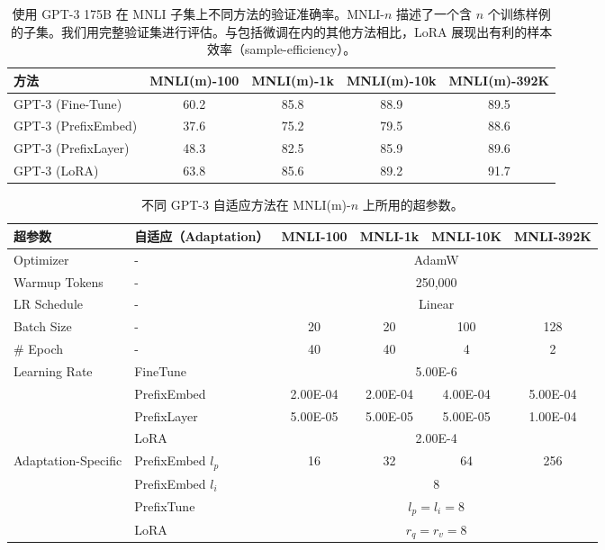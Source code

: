 \documentclass[11pt,UTF8,fontset=fandol]{ctexart}
\begin{document}
\begin{table}[H]\centering
\caption{使用 GPT-3 175B 在 MNLI 子集上不同方法的验证准确率。MNLI-$n$ 描述了一个含 $n$ 个训练样例的子集。我们用完整验证集进行评估。与包括微调在内的其他方法相比，LoRA 展现出有利的样本效率（sample-efficiency）。}
\label{tab:16}
\begin{tabular}{lcccc}
\toprule
方法 & MNLI(m)-100 & MNLI(m)-1k & MNLI(m)-10k & MNLI(m)-392K \\
\midrule
GPT-3 (Fine-Tune) & 60.2 & 85.8 & 88.9 & 89.5 \\
GPT-3 (PrefixEmbed) & 37.6 & 75.2 & 79.5 & 88.6 \\
GPT-3 (PrefixLayer) & 48.3 & 82.5 & 85.9 & 89.6 \\
GPT-3 (LoRA) & 63.8 & 85.6 & 89.2 & 91.7 \\
\bottomrule
\end{tabular}
\end{table}

\begin{table}[H]\centering
\caption{不同 GPT-3 自适应方法在 MNLI(m)-$n$ 上所用的超参数。}
\label{tab:17}
\begin{tabular}{llcccc}
\toprule
超参数 & 自适应（Adaptation） & MNLI-100 & MNLI-1k & MNLI-10K & MNLI-392K \\
\midrule
Optimizer & - & \multicolumn{4}{c}{AdamW} \\
Warmup Tokens & - & \multicolumn{4}{c}{250{,}000} \\
LR Schedule & - & \multicolumn{4}{c}{Linear} \\
Batch Size & - & 20 & 20 & 100 & 128 \\
\# Epoch & - & 40 & 40 & 4 & 2 \\
\midrule
\multirow{4}{*}{Learning Rate}
 & FineTune & \multicolumn{4}{c}{5.00E-6} \\
 & PrefixEmbed & 2.00E-04 & 2.00E-04 & 4.00E-04 & 5.00E-04 \\
 & PrefixLayer & 5.00E-05 & 5.00E-05 & 5.00E-05 & 1.00E-04 \\
 & LoRA & \multicolumn{4}{c}{2.00E-4} \\
\midrule
\multirow{4}{*}{Adaptation-Specific}
 & PrefixEmbed $l_p$ & 16 & 32 & 64 & 256 \\
 & PrefixEmbed $l_i$ & \multicolumn{4}{c}{8} \\
 & PrefixTune & \multicolumn{4}{c}{$l_p=l_i=8$} \\
 & LoRA & \multicolumn{4}{c}{$r_q=r_v=8$} \\
\bottomrule
\end{tabular}
\end{table}
\end{document}
